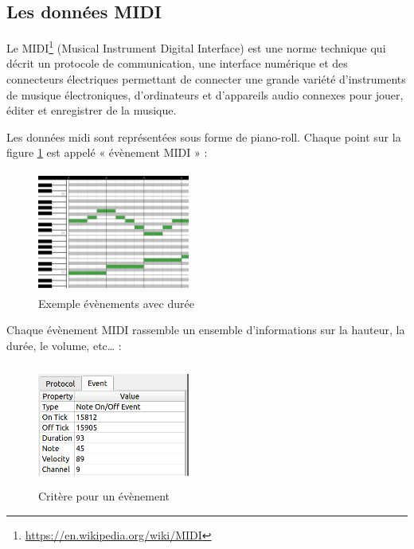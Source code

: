 \subsection*{Les données MIDI}
Le MIDI\footnote{\url{https://en.wikipedia.org/wiki/MIDI}} (Musical Instrument Digital Interface) 
est une norme technique qui décrit un protocole de communication, une interface numérique et des connecteurs électriques permettant de connecter une grande variété d'instruments de musique électroniques, d'ordinateurs et d'appareils audio connexes pour jouer, éditer et enregistrer de la musique.

Les données midi sont représentées sous forme de piano-roll. 
%
Chaque point sur la figure \ref{piano_roll} est appelé « évènement MIDI » :
\begin{figure}[!h]
	\centering
	\includegraphics[height=40mm, width=50mm]{z_images/1_contexte/2_midi_piano.jpg}
	\caption{Exemple évènements avec durée}
	\label{piano_roll}
\end{figure}

Chaque évènement MIDI rassemble un ensemble d’informations sur la hauteur, la durée, le volume, etc… :
\begin{figure}[h!]
	\centering
	\includegraphics[height=40mm, width=50mm]{z_images/1_contexte/3_evenements_midi.png}
	\caption{Critère pour un évènement}
\end{figure} %
{}


